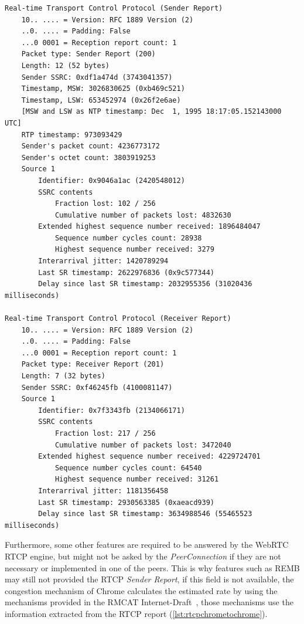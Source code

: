 \lstset{language=sh}
\begin{lstlisting}[caption={RTCP message exchange between Chrome and Firefox},label={lst:rtcpchrometochrome}]
Real-time Transport Control Protocol (Sender Report)
    10.. .... = Version: RFC 1889 Version (2)
    ..0. .... = Padding: False
    ...0 0001 = Reception report count: 1
    Packet type: Sender Report (200)
    Length: 12 (52 bytes)
    Sender SSRC: 0xdf1a474d (3743041357)
    Timestamp, MSW: 3026830625 (0xb469c521)
    Timestamp, LSW: 653452974 (0x26f2e6ae)
    [MSW and LSW as NTP timestamp: Dec  1, 1995 18:17:05.152143000 UTC]
    RTP timestamp: 973093429
    Sender's packet count: 4236773172
    Sender's octet count: 3803919253
    Source 1
        Identifier: 0x9046a1ac (2420548012)
        SSRC contents
            Fraction lost: 102 / 256
            Cumulative number of packets lost: 4832630
        Extended highest sequence number received: 1896484047
            Sequence number cycles count: 28938
            Highest sequence number received: 3279
        Interarrival jitter: 1420789294
        Last SR timestamp: 2622976836 (0x9c577344)
        Delay since last SR timestamp: 2032955356 (31020436 milliseconds)

Real-time Transport Control Protocol (Receiver Report)
    10.. .... = Version: RFC 1889 Version (2)
    ..0. .... = Padding: False
    ...0 0001 = Reception report count: 1
    Packet type: Receiver Report (201)
    Length: 7 (32 bytes)
    Sender SSRC: 0xf46245fb (4100081147)
    Source 1
        Identifier: 0x7f3343fb (2134066171)
        SSRC contents
            Fraction lost: 217 / 256
            Cumulative number of packets lost: 3472040
        Extended highest sequence number received: 4229724701
            Sequence number cycles count: 64540
            Highest sequence number received: 31261
        Interarrival jitter: 1181356458
        Last SR timestamp: 2930563385 (0xaeacd939)
        Delay since last SR timestamp: 3634988546 (55465523 milliseconds)
\end{lstlisting}

Furthermore, some other features are required to be answered by the WebRTC RTCP engine, but might not be asked by the {\it PeerConnection} if they are not necessary or implemented in one of the peers. This is why features such as REMB may still not provided the RTCP {\it Sender Report}, if this field is not available, the congestion mechanism of Chrome calculates the estimated rate by using the mechanisms provided in the RMCAT Internet-Draft~\cite{alvestrandCongestion2012}, those mechanisms use the information extracted from the RTCP report (\ref{lst:rtcpchrometochrome}). 

